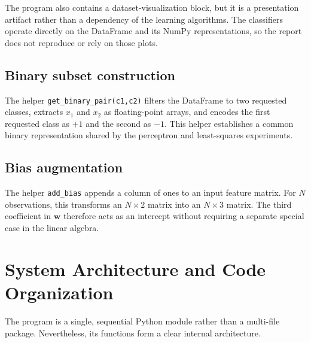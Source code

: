 \documentclass[11pt,a4paper]{article}
\newcommand{\code}[1]{\texttt{#1}}
\begin{document}
The program also contains a dataset-visualization block, but it is a presentation artifact rather than a dependency of the learning algorithms. The classifiers operate directly on the DataFrame and its NumPy representations, so the report does not reproduce or rely on those plots.

\subsection{Binary subset construction}
The helper \code{get\_binary\_pair(c1,c2)} filters the DataFrame to two requested classes, extracts \(x_1\) and \(x_2\) as floating-point arrays, and encodes the first requested class as \(+1\) and the second as \(-1\). This helper establishes a common binary representation shared by the perceptron and least-squares experiments.

\subsection{Bias augmentation}
The helper \code{add\_bias} appends a column of ones to an input feature matrix. For \(N\) observations, this transforms an \(N\times2\) matrix into an \(N\times3\) matrix. The third coefficient in \(\mathbf{w}\) therefore acts as an intercept without requiring a separate special case in the linear algebra.

\section{System Architecture and Code Organization}
The program is a single, sequential Python module rather than a multi-file package. Nevertheless, its functions form a clear internal architecture.
\end{document}
